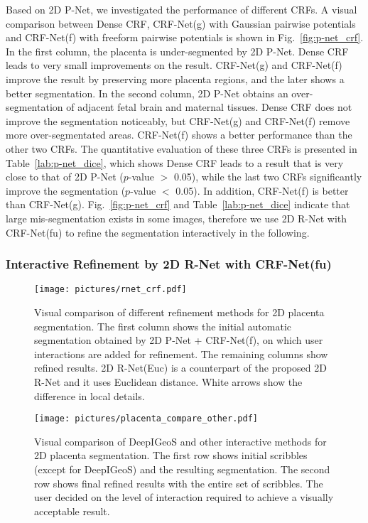 \documentclass[10pt,journal,compsoc]{IEEEtran}
\begin{document}
Based on 2D P-Net, we investigated the performance of different CRFs. A visual comparison between Dense CRF, CRF-Net(g) with Gaussian pairwise potentials and CRF-Net(f) with freeform pairwise potentials is shown in Fig.~\ref{fig:p-net_crf}. In the first column, the placenta is under-segmented by 2D P-Net. Dense CRF leads to very small improvements on the result. CRF-Net(g) and CRF-Net(f) improve the result by preserving more placenta regions, and the later shows a better segmentation. In the second column, 2D P-Net obtains an over-segmentation of adjacent fetal brain and maternal tissues. Dense CRF does not improve the segmentation noticeably, but CRF-Net(g) and CRF-Net(f) remove more over-segmentated areas. CRF-Net(f) shows a better performance than the other two CRFs. The quantitative evaluation of these three CRFs is presented in Table~\ref{lab:p-net_dice}, which shows Dense CRF leads to a result that is very close to that of 2D P-Net ($p$-value $>$ 0.05), while the last two CRFs significantly improve the segmentation ($p$-value $<$ 0.05). In addition, CRF-Net(f) is better than CRF-Net(g). %
Fig.~\ref{fig:p-net_crf} and Table~\ref{lab:p-net_dice} indicate that large mis-segmentation exists in some images, therefore we use 2D R-Net with CRF-Net(fu) to refine the segmentation interactively in the following.


\subsubsection{Interactive Refinement by 2D R-Net with CRF-Net(fu) }


\begin{figure*}[t]
	\centering
	\texttt{[image: pictures/rnet\_crf.pdf]}
	\caption[Visual comparison of different refinement methods for 2D placenta segmentation.]{ 
		Visual comparison of different refinement methods for 2D placenta segmentation. The first column shows the initial automatic segmentation obtained by 2D P-Net + CRF-Net(f), on which user interactions are added for refinement. The remaining columns show refined results. 2D R-Net(Euc) is a counterpart of the proposed 2D R-Net and it uses Euclidean distance. White arrows show the difference in local details.} 
	\label{fig:r_net_crf}
\end{figure*}


\begin{figure*}[t]
	\centering
	\texttt{[image: pictures/placenta\_compare\_other.pdf]}
	\caption[Visual comparison of DeepIGeoS and other interactive methods for 2D placenta segmentation.]{ 
		Visual comparison of DeepIGeoS and other interactive methods for 2D placenta segmentation. 
		The first row shows initial scribbles (except for DeepIGeoS) and the resulting segmentation. The second row shows final refined results with the entire set of scribbles. The user decided on the level of interaction required to achieve a visually acceptable result. } 
	\label{fig:compare_interactive_placenta}
\end{figure*}
\end{document}
